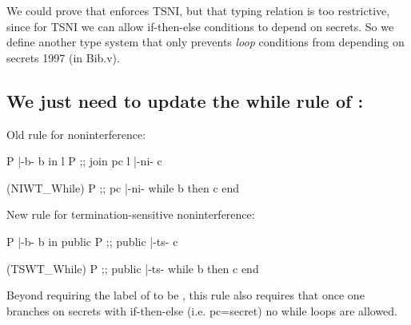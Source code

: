 \documentclass[12pt]{report}
\begin{document}
We could prove that  enforces TSNI, but that typing
    relation is too restrictive, since for TSNI we can allow
    if-then-else conditions to depend on secrets. So we define another
    type system that only prevents \textit{loop} conditions from depending on
    secrets    1997 (in Bib.v). 
\begin{coqdoccode}
\coqdocemptyline
\end{coqdoccode}
\subsection{We just need to update the while rule of \texorpdfstring{\protect{}}{ni\_well\_typed}:}



 Old rule for noninterference:


              P |-b- b in l    P ;; join pc l |-ni- c
\par
\noindent\hrulefill\par
\noindent{}       (NIWT\_While)
                P ;; pc |-ni- while b then c end


    New rule for termination-sensitive noninterference:


          P |-b- b in public    P ;; public |-ts- c
\par
\noindent\hrulefill\par
\noindent{}       (TSWT\_While)
             P ;; public |-ts- while b then c end


   Beyond requiring the label of  to be , this rule also
   requires that once one branches on secrets with if-then-else
   (i.e. pc=secret) no while loops are allowed.
\end{document}
